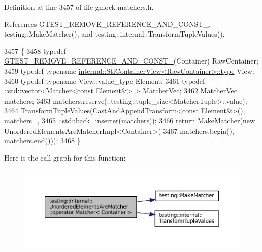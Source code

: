 Definition at line 3457 of file gmock-\/matchers.\+h.



References G\+T\+E\+S\+T\+\_\+\+R\+E\+M\+O\+V\+E\+\_\+\+R\+E\+F\+E\+R\+E\+N\+C\+E\+\_\+\+A\+N\+D\+\_\+\+C\+O\+N\+S\+T\+\_\+, testing\+::\+Make\+Matcher(), and testing\+::internal\+::\+Transform\+Tuple\+Values().


\begin{DoxyCode}
3457                                       \{
3458     \textcolor{keyword}{typedef} \hyperlink{gtest-internal_8h_a874567b176266188fabfffb8393267ce}{GTEST\_REMOVE\_REFERENCE\_AND\_CONST\_}(Container) RawContainer;
3459     \textcolor{keyword}{typedef} \textcolor{keyword}{typename} \hyperlink{classtesting_1_1internal_1_1StlContainerView_a2b2c63a6dcdbfe63fb0ee121ebf463ba}{internal::StlContainerView<RawContainer>::type}
       View;
3460     \textcolor{keyword}{typedef} \textcolor{keyword}{typename} View::value\_type Element;
3461     typedef ::std::vector<Matcher<const Element&> > MatcherVec;
3462     MatcherVec matchers;
3463     matchers.reserve(::testing::tuple\_size<MatcherTuple>::value);
3464     \hyperlink{namespacetesting_1_1internal_a07ba091a64aa2ba95e41accc55dc8855}{TransformTupleValues}(CastAndAppendTransform<const Element&>(), 
      \hyperlink{classtesting_1_1internal_1_1UnorderedElementsAreMatcher_acfcd56f88943d922d7e7ecd8d9c5eb9f}{matchers\_},
3465                          ::std::back\_inserter(matchers));
3466     \textcolor{keywordflow}{return} \hyperlink{namespacetesting_a37fd8029ac00e60952440a3d9cca8166}{MakeMatcher}(\textcolor{keyword}{new} UnorderedElementsAreMatcherImpl<Container>(
3467                            matchers.begin(), matchers.end()));
3468   \}
\end{DoxyCode}
Here is the call graph for this function\+:
\nopagebreak
\begin{figure}[H]
\begin{center}
\leavevmode
\includegraphics[width=350pt]{classtesting_1_1internal_1_1UnorderedElementsAreMatcher_a5191cb321191985e257225b9a5df95f5_cgraph}
\end{center}
\end{figure}


